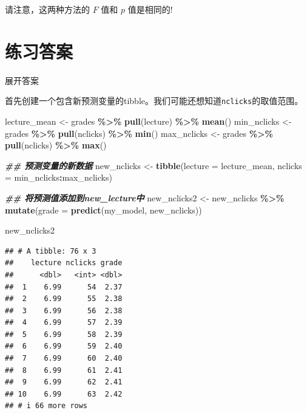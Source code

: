 \documentclass[
]{book}
\newenvironment{Shaded}{\begin{snugshade}}{\end{snugshade}}
\newcommand{\AttributeTok}[1]{\textcolor[rgb]{0.13,0.29,0.53}{#1}}
\newcommand{\DocumentationTok}[1]{\textcolor[rgb]{0.56,0.35,0.01}{\textbf{\textit{#1}}}}
\newcommand{\FunctionTok}[1]{\textcolor[rgb]{0.13,0.29,0.53}{\textbf{#1}}}
\newcommand{\NormalTok}[1]{#1}
\newcommand{\OtherTok}[1]{\textcolor[rgb]{0.56,0.35,0.01}{#1}}
\newcommand{\SpecialCharTok}[1]{\textcolor[rgb]{0.81,0.36,0.00}{\textbf{#1}}}
\begin{document}
请注意，这两种方法的 \(F\) 值和 \(p\) 值是相同的!

\hypertarget{ux7ec3ux4e60ux7b54ux6848}{%
\section{练习答案}\label{ux7ec3ux4e60ux7b54ux6848}}

展开答案

首先创建一个包含新预测变量的tibble。我们可能还想知道\texttt{nclicks}的取值范围。

\begin{Shaded}
\begin{Highlighting}[]
\NormalTok{lecture\_mean }\OtherTok{\textless{}{-}}\NormalTok{ grades }\SpecialCharTok{\%\textgreater{}\%} \FunctionTok{pull}\NormalTok{(lecture) }\SpecialCharTok{\%\textgreater{}\%} \FunctionTok{mean}\NormalTok{()}
\NormalTok{min\_nclicks }\OtherTok{\textless{}{-}}\NormalTok{ grades }\SpecialCharTok{\%\textgreater{}\%} \FunctionTok{pull}\NormalTok{(nclicks) }\SpecialCharTok{\%\textgreater{}\%} \FunctionTok{min}\NormalTok{()}
\NormalTok{max\_nclicks }\OtherTok{\textless{}{-}}\NormalTok{ grades }\SpecialCharTok{\%\textgreater{}\%} \FunctionTok{pull}\NormalTok{(nclicks) }\SpecialCharTok{\%\textgreater{}\%} \FunctionTok{max}\NormalTok{()}

\DocumentationTok{\#\# 预测变量的新数据}
\NormalTok{new\_nclicks }\OtherTok{\textless{}{-}} \FunctionTok{tibble}\NormalTok{(}\AttributeTok{lecture =}\NormalTok{ lecture\_mean,}
                      \AttributeTok{nclicks =}\NormalTok{ min\_nclicks}\SpecialCharTok{:}\NormalTok{max\_nclicks)}

\DocumentationTok{\#\# 将预测值添加到new\_lecture中}
\NormalTok{new\_nclicks2 }\OtherTok{\textless{}{-}}\NormalTok{ new\_nclicks }\SpecialCharTok{\%\textgreater{}\%}
  \FunctionTok{mutate}\NormalTok{(}\AttributeTok{grade =} \FunctionTok{predict}\NormalTok{(my\_model, new\_nclicks))}

\NormalTok{new\_nclicks2}
\end{Highlighting}
\end{Shaded}

\begin{verbatim}
## # A tibble: 76 x 3
##    lecture nclicks grade
##      <dbl>   <int> <dbl>
##  1    6.99      54  2.37
##  2    6.99      55  2.38
##  3    6.99      56  2.38
##  4    6.99      57  2.39
##  5    6.99      58  2.39
##  6    6.99      59  2.40
##  7    6.99      60  2.40
##  8    6.99      61  2.41
##  9    6.99      62  2.41
## 10    6.99      63  2.42
## # i 66 more rows
\end{verbatim}
\end{document}
